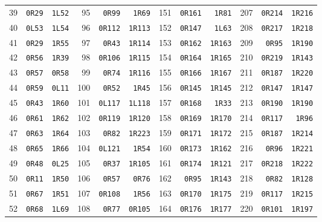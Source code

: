 \begin{center}
\begin{tabular}{rrr@{\hspace{5mm}}rrr@{\hspace{5mm}}rrr@{\hspace{5mm}}rrr}
39 & \texttt{0R29} & \texttt{1L52} & 95 & \texttt{0R99} & \texttt{1R69} & 151 & \texttt{0R161} & \texttt{1R81} & 207 & \texttt{0R214} & \texttt{1R216} \\
40 & \texttt{0L53} & \texttt{1L54} & 96 & \texttt{0R112} & \texttt{1R113} & 152 & \texttt{0R147} & \texttt{1L63} & 208 & \texttt{0R217} & \texttt{1R218} \\
41 & \texttt{0R29} & \texttt{1R55} & 97 & \texttt{0R43} & \texttt{1R114} & 153 & \texttt{0R162} & \texttt{1R163} & 209 & \texttt{0R95} & \texttt{1R190} \\
42 & \texttt{0R56} & \texttt{1R39} & 98 & \texttt{0R106} & \texttt{1R115} & 154 & \texttt{0R164} & \texttt{1R165} & 210 & \texttt{0R219} & \texttt{1R143} \\
43 & \texttt{0R57} & \texttt{0R58} & 99 & \texttt{0R74} & \texttt{1R116} & 155 & \texttt{0R166} & \texttt{1R167} & 211 & \texttt{0R187} & \texttt{1R220} \\
44 & \texttt{0R59} & \texttt{0L11} & 100 & \texttt{0R52} & \texttt{1R45} & 156 & \texttt{0R145} & \texttt{1R145} & 212 & \texttt{0R147} & \texttt{1R147} \\
45 & \texttt{0R43} & \texttt{1R60} & 101 & \texttt{0L117} & \texttt{1L118} & 157 & \texttt{0R168} & \texttt{1R33} & 213 & \texttt{0R190} & \texttt{1R190} \\
46 & \texttt{0R61} & \texttt{1R62} & 102 & \texttt{0R119} & \texttt{1R120} & 158 & \texttt{0R169} & \texttt{1R170} & 214 & \texttt{0R117} & \texttt{1R96} \\
47 & \texttt{0R63} & \texttt{1R64} & 103 & \texttt{0R82} & \texttt{1R223} & 159 & \texttt{0R171} & \texttt{1R172} & 215 & \texttt{0R187} & \texttt{1R214} \\
48 & \texttt{0R65} & \texttt{1R66} & 104 & \texttt{0L121} & \texttt{1R54} & 160 & \texttt{0R173} & \texttt{1R162} & 216 & \texttt{0R96} & \texttt{1R221} \\
49 & \texttt{0R48} & \texttt{0L25} & 105 & \texttt{0R37} & \texttt{1R105} & 161 & \texttt{0R174} & \texttt{1R121} & 217 & \texttt{0R218} & \texttt{1R222} \\
50 & \texttt{0R11} & \texttt{1R50} & 106 & \texttt{0R57} & \texttt{0R76} & 162 & \texttt{0R95} & \texttt{1R143} & 218 & \texttt{0R82} & \texttt{1R128} \\
51 & \texttt{0R67} & \texttt{1R51} & 107 & \texttt{0R108} & \texttt{1R56} & 163 & \texttt{0R170} & \texttt{1R175} & 219 & \texttt{0R117} & \texttt{1R215} \\
52 & \texttt{0R68} & \texttt{1L69} & 108 & \texttt{0R77} & \texttt{0R105} & 164 & \texttt{0R176} & \texttt{1R177} & 220 & \texttt{0R101} & \texttt{1R197} \\

\end{tabular}
\end{center}
